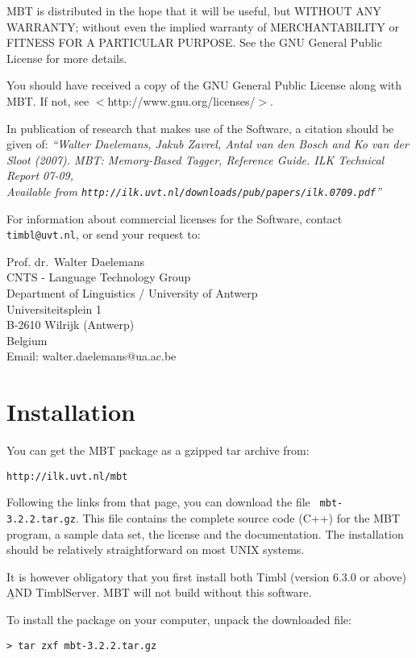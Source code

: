 \documentclass{report}
\begin{document}
MBT is distributed in the hope that it will be useful, but WITHOUT
ANY WARRANTY; without even the implied warranty of MERCHANTABILITY or
FITNESS FOR A PARTICULAR PURPOSE.  See the GNU General Public License
for more details.

You should have received a copy of the GNU General Public License
along with MBT.  If not, see $<$http://www.gnu.org/licenses/$>$.

In publication of research that makes use of the Software, a
citation should be given of: {\em ``Walter Daelemans, Jakub Zavrel,
Antal van den Bosch and Ko van der Sloot (2007). MBT: Memory-Based
Tagger, Reference Guide. ILK Technical Report 07-09, \\
Available from
{\tt http://ilk.uvt.nl/downloads/pub/papers/ilk.0709.pdf}''}

For information about commercial licenses for the Software,
contact {\tt timbl@uvt.nl}, or send your request to:

Prof. dr.~Walter Daelemans\\
CNTS - Language Technology Group\\
Department of Linguistics / University of Antwerp\\
Universiteitsplein 1\\
B-2610 Wilrijk (Antwerp)\\
Belgium\\
Email: walter.daelemans@ua.ac.be

\pagestyle{headings}

\chapter{Installation}
\vspace{-1cm}
You can get the MBT package as a gzipped tar archive from:

{\tt http://ilk.uvt.nl/mbt}

Following the links from that page, you can download the file {\tt
  mbt-3.2.2.tar.gz}. This file contains the complete source code (C++)
for the MBT program, a sample data set, the license and the
documentation.
The installation should be relatively straightforward on most UNIX systems.

It is however obligatory that you first install both Timbl (version 6.3.0 or above) {\b AND} TimblServer. MBT will not build without this software.

To install the package on your computer, unpack the downloaded file:

{\tt > tar zxf mbt-3.2.2.tar.gz}
\end{document}
